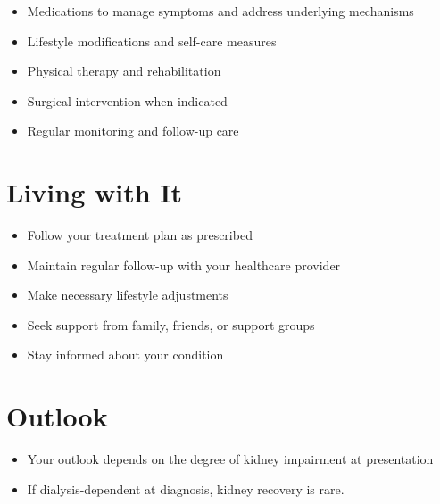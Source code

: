\begin{itemize}[noitemsep]
  \item Medications to manage symptoms and address underlying mechanisms
  \item Lifestyle modifications and self-care measures
  \item Physical therapy and rehabilitation
  \item Surgical intervention when indicated
  \item Regular monitoring and follow-up care
\end{itemize}
\section{Living with It}
\begin{itemize}[noitemsep]
  \item Follow your treatment plan as prescribed
  \item Maintain regular follow-up with your healthcare provider
  \item Make necessary lifestyle adjustments
  \item Seek support from family, friends, or support groups
  \item Stay informed about your condition
\end{itemize}
\section{Outlook}
\begin{itemize}[noitemsep]
  \item Your outlook depends on the degree of kidney impairment at presentation
  \item If dialysis-dependent at diagnosis, kidney recovery is rare.
\end{itemize}
